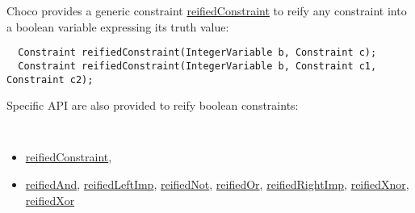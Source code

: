 Choco provides a generic constraint \hyperlink{reifiedconstraint:reifiedconstraintconstraint}{reifiedConstraint} to reify any constraint into a boolean variable expressing its truth value:
\begin{lstlisting}
  Constraint reifiedConstraint(IntegerVariable b, Constraint c);
  Constraint reifiedConstraint(IntegerVariable b, Constraint c1, Constraint c2);
\end{lstlisting}
Specific API are also provided to reify boolean constraints:  
\begin{notedef}\tt
  \begin{itemize}
  \item \hyperlink{reifiedconstraint:reifiedconstraintconstraint}{reifiedConstraint}, 
   \item \hyperlink{reifiedand:reifiedandconstraint}{reifiedAnd}, \hyperlink{reifiedleftimp:reifiedleftimpconstraint}{reifiedLeftImp}, \hyperlink{reifiednot:reifiednotconstraint}{reifiedNot}, \hyperlink{reifiedor:reifiedorconstraint}{reifiedOr}, \hyperlink{reifiedrightimp:reifiedrightimpconstraint}{reifiedRightImp}, \hyperlink{reifiedxnor:reifiedxnorconstraint}{reifiedXnor}, \hyperlink{reifiedxor:reifiedxorconstraint}{reifiedXor}
  \end{itemize}
\end{notedef}




